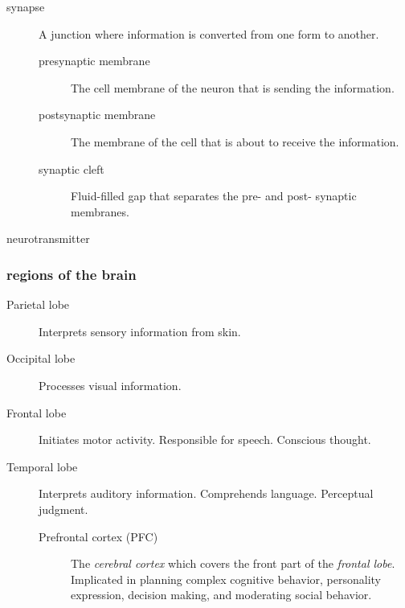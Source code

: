 \documentclass[11pt]{article}
\begin{document}
\begin{description}
\item[{synapse}] A junction where information is converted from one form to
another. 
\begin{description}
\item[{presynaptic membrane}] The cell membrane of the neuron that is sending
the information.
\item[{postsynaptic membrane}] The membrane of the cell that is about to
receive the information.
\item[{synaptic cleft}] Fluid-filled gap that separates the pre- and post-
synaptic membranes.
\end{description}

\item[{neurotransmitter}] 
\end{description}

\subsubsection{regions of the brain}
\label{sec:org720bed0}
\begin{description}
\item[{Parietal lobe}] Interprets sensory information from skin.
\item[{Occipital lobe}] Processes visual information.
\item[{Frontal lobe}] Initiates motor activity. Responsible for speech.
Conscious thought.
\item[{Temporal lobe}] Interprets auditory information. Comprehends language.
Perceptual judgment.
\begin{description}
\item[{Prefrontal cortex (PFC)}] The \emph{cerebral cortex} which covers the front
part of the \emph{frontal lobe}. Implicated in planning complex cognitive
behavior, personality expression, decision making, and moderating
social behavior.
\end{description}
\end{description}
\end{document}
